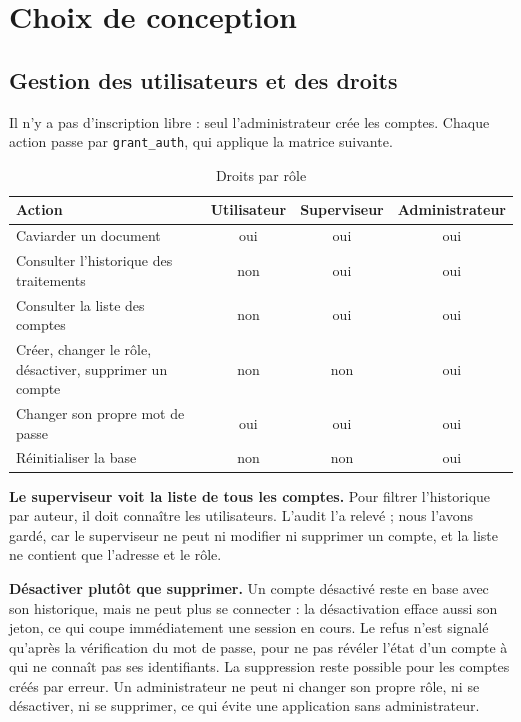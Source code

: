 \documentclass[12pt,a4paper]{article}
\begin{document}

\section{Choix de conception}
\label{sec:choix}

\subsection{Gestion des utilisateurs et des droits}

Il n'y a pas d'inscription libre : seul l'administrateur crée les comptes. Chaque action passe par \texttt{grant\_auth}, qui applique la matrice suivante.

\begin{table}[htbp]
    \centering
    \small
    \begin{tabular}{lccc}
        \toprule
        \textbf{Action} & \textbf{Utilisateur} & \textbf{Superviseur} & \textbf{Administrateur} \\
        \midrule
        Caviarder un document & oui & oui & oui \\
        Consulter l'historique des traitements & non & oui & oui \\
        Consulter la liste des comptes & non & oui & oui \\
        Créer, changer le rôle, désactiver, supprimer un compte & non & non & oui \\
        Changer son propre mot de passe & oui & oui & oui \\
        Réinitialiser la base & non & non & oui \\
        \bottomrule
    \end{tabular}
    \caption{Droits par rôle}
\end{table}

\textbf{Le superviseur voit la liste de tous les comptes.} Pour filtrer l'historique par auteur, il doit connaître les utilisateurs. L'audit l'a relevé ; nous l'avons gardé, car le superviseur ne peut ni modifier ni supprimer un compte, et la liste ne contient que l'adresse et le rôle.

\textbf{Désactiver plutôt que supprimer.} Un compte désactivé reste en base avec son historique, mais ne peut plus se connecter : la désactivation efface aussi son jeton, ce qui coupe immédiatement une session en cours. Le refus n'est signalé qu'après la vérification du mot de passe, pour ne pas révéler l'état d'un compte à qui ne connaît pas ses identifiants. La suppression reste possible pour les comptes créés par erreur. Un administrateur ne peut ni changer son propre rôle, ni se désactiver, ni se supprimer, ce qui évite une application sans administrateur.
\end{document}
